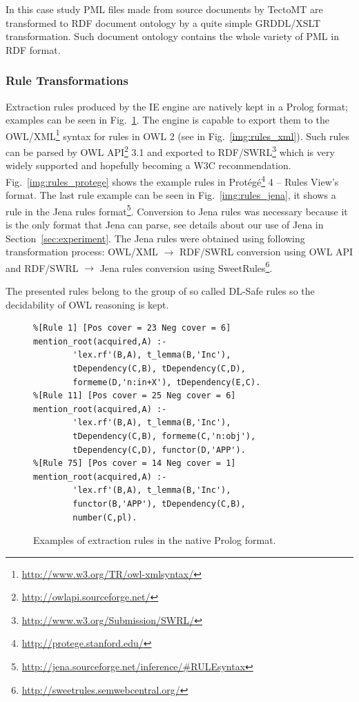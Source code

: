 In this case study PML files made from source documents by TectoMT are transformed to RDF document ontology by a quite simple GRDDL/XSLT transformation. Such document ontology contains the whole variety of PML in RDF format.







\subsubsection{Rule Transformations}

Extraction rules produced by the IE engine are natively kept in a Prolog format; examples can be seen in Fig.~\ref{img:rules_prolog}. The engine is capable to export them to the OWL/XML\footnote{\url{http://www.w3.org/TR/owl-xmlsyntax/}} syntax for rules in OWL 2 \citep{GHPP09a} (see in Fig.~\ref{img:rules_xml}). Such rules can be parsed by OWL API\footnote{\url{http://owlapi.sourceforge.net/}} 3.1
and exported to RDF/SWRL\footnote{\url{http://www.w3.org/Submission/SWRL/}} which is very widely supported and hopefully becoming a W3C recommendation.
Fig.~\ref{img:rules_protege} shows the example rules in Prot\'{e}g\'{e}\footnote{\url{http://protege.stanford.edu/}} 4 -- Rules View's format. The last rule example can be seen in Fig.~\ref{img:rules_jena}, it shows a rule in the Jena rules format\footnote{\url{http://jena.sourceforge.net/inference/#RULEsyntax}}. Conversion to Jena rules was necessary because it is the only format that Jena can parse, see details about our use of Jena in Section~\ref{sec:experiment}. The Jena rules were obtained using following transformation process: OWL/XML $\rightarrow$ RDF/SWRL conversion using OWL API and RDF/SWRL $\rightarrow$ Jena rules conversion using SweetRules\footnote{\url{http://sweetrules.semwebcentral.org/}}.

The presented rules belong to the group of so called DL-Safe rules \citep{Motik:DL-Safe-rules} so the decidability of OWL reasoning is kept.




\begin{figure}
\begin{verbatim}
%[Rule 1] [Pos cover = 23 Neg cover = 6]
mention_root(acquired,A) :-
		'lex.rf'(B,A), t_lemma(B,'Inc'),
		tDependency(C,B), tDependency(C,D),
		formeme(D,'n:in+X'), tDependency(E,C).
%[Rule 11] [Pos cover = 25 Neg cover = 6]
mention_root(acquired,A) :-
		'lex.rf'(B,A), t_lemma(B,'Inc'),
		tDependency(C,B), formeme(C,'n:obj'),
		tDependency(C,D), functor(D,'APP').
%[Rule 75] [Pos cover = 14 Neg cover = 1]
mention_root(acquired,A) :-
		'lex.rf'(B,A), t_lemma(B,'Inc'),
		functor(B,'APP'), tDependency(C,B),
		number(C,pl).							
\end{verbatim}
	\caption{Examples of extraction rules in the native Prolog format.}
	\label{img:rules_prolog}
\end{figure}


